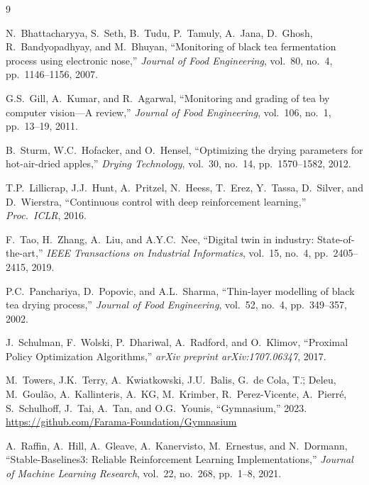 ﻿\documentclass[12pt, a4paper]{report}
\begin{document}

\begin{thebibliography}{9}

N.\ Bhattacharyya, S.\ Seth, B.\ Tudu, P.\ Tamuly, A.\ Jana, D.\ Ghosh, R.\ Bandyopadhyay, and M.\ Bhuyan,
``Monitoring of black tea fermentation process using electronic nose,''
\emph{Journal of Food Engineering}, vol.\ 80, no.\ 4, pp.\ 1146--1156, 2007.

G.S.\ Gill, A.\ Kumar, and R.\ Agarwal,
``Monitoring and grading of tea by computer vision---A review,''
\emph{Journal of Food Engineering}, vol.\ 106, no.\ 1, pp.\ 13--19, 2011.

B.\ Sturm, W.C.\ Hofacker, and O.\ Hensel,
``Optimizing the drying parameters for hot-air-dried apples,''
\emph{Drying Technology}, vol.\ 30, no.\ 14, pp.\ 1570--1582, 2012.

T.P.\ Lillicrap, J.J.\ Hunt, A.\ Pritzel, N.\ Heess, T.\ Erez, Y.\ Tassa, D.\ Silver, and D.\ Wierstra,
``Continuous control with deep reinforcement learning,''
\emph{Proc.\ ICLR}, 2016.

F.\ Tao, H.\ Zhang, A.\ Liu, and A.Y.C.\ Nee,
``Digital twin in industry: State-of-the-art,''
\emph{IEEE Transactions on Industrial Informatics}, vol.\ 15, no.\ 4, pp.\ 2405--2415, 2019.

P.C.\ Panchariya, D.\ Popovic, and A.L.\ Sharma,
``Thin-layer modelling of black tea drying process,''
\emph{Journal of Food Engineering}, vol.\ 52, no.\ 4, pp.\ 349--357, 2002.

J.\ Schulman, F.\ Wolski, P.\ Dhariwal, A.\ Radford, and O.\ Klimov,
``Proximal Policy Optimization Algorithms,''
\emph{arXiv preprint arXiv:1707.06347}, 2017.

M.\ Towers, J.K.\ Terry, A.\ Kwiatkowski, J.U.\ Balis, G.\ de Cola, T.\"; Deleu, M.\ Goul\~{a}o, A.\ Kallinteris, A.\ KG, M.\ Krimber, R.\ Perez-Vicente, A.\ Pierr\'{e}, S.\ Schulhoff, J.\ Tai, A.\ Tan, and O.G.\ Younis,
``Gymnasium,''
2023. \url{https://github.com/Farama-Foundation/Gymnasium}

A.\ Raffin, A.\ Hill, A.\ Gleave, A.\ Kanervisto, M.\ Ernestus, and N.\ Dormann,
``Stable-Baselines3: Reliable Reinforcement Learning Implementations,''
\emph{Journal of Machine Learning Research}, vol.\ 22, no.\ 268, pp.\ 1--8, 2021.

\end{thebibliography}
\end{document}
